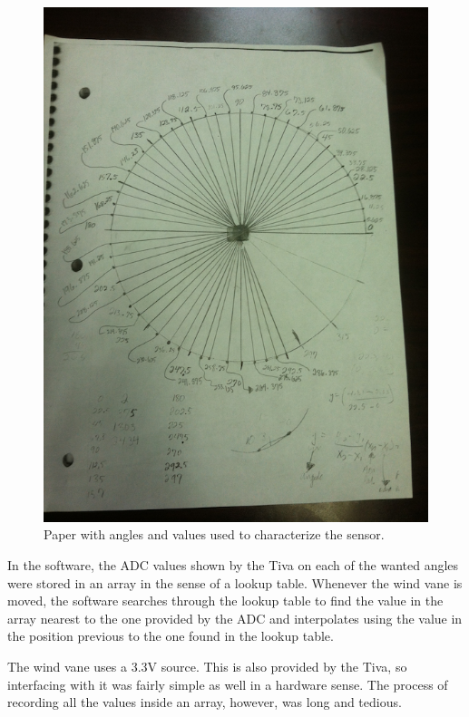 		\begin{figure}[H]
			\centering
				\includegraphics[scale=0.35]{img/estimationDiagram}
			\caption{Paper with angles and values used to characterize the sensor.}
		\end{figure}
		
		In the software, the ADC values shown by the Tiva on each of the wanted angles were stored in an array in the sense of a lookup table. Whenever the wind vane is moved, the software searches through the lookup table to find the value in the array nearest to the one provided by the ADC and interpolates using the value in the position previous to the one found in the lookup table.
		
		The wind vane uses a 3.3V source. This is also provided by the Tiva, so interfacing with it was fairly simple as well in a hardware sense. The process of recording all the values inside an array, however, was long and tedious. 
		
